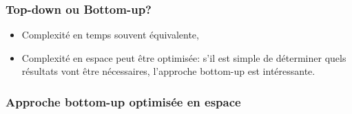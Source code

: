 \documentclass[svgnames,11pt]{beamer}
\begin{document}
\begin{frame}
    \frametitle{Top-down ou Bottom-up?}

    \begin{itemize}
        \item<1-> Complexité en temps souvent équivalente,
        \item<2-> Complexité en espace peut être optimisée: s'il est simple de déterminer quels résultats vont être nécessaires, l'approche bottom-up est intéressante.
    \end{itemize}

\end{frame}

\begin{frame}
    \frametitle{Approche bottom-up optimisée en espace}

    

\end{frame}
\end{document}
